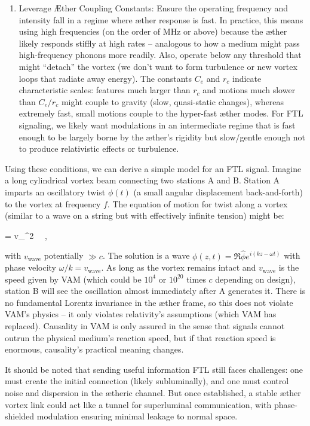 \begin{enumerate}
\item 
Leverage Æther Coupling Constants: Ensure the operating frequency and intensity fall in a regime where æther response is fast. In practice, this means using high frequencies (on the order of MHz or above) because the æther likely responds stiffly at high rates – analogous to how a medium might pass high-frequency phonons more readily. Also, operate below any threshold that might “detach” the vortex (we don’t want to form turbulence or new vortex loops that radiate away energy). The constants $C_e$ and $r_c$ indicate characteristic scales: features much larger than $r_c$ and motions much slower than $C_e/r_c$ might couple to gravity (slow, quasi-static changes), whereas extremely fast, small motions couple to the hyper-fast æther modes. For FTL signaling, we likely want modulations in an intermediate regime that is fast enough to be largely borne by the æther’s rigidity but slow/gentle enough not to produce relativistic effects or turbulence.




\end{enumerate}

Using these conditions, we can derive a simple model for an FTL signal. Imagine a long cylindrical vortex beam connecting two stations A and B. Station A imparts an oscillatory twist $\phi(t)$ (a small angular displacement back-and-forth) to the vortex at frequency $f$. The equation of motion for twist along a vortex (similar to a wave on a string but with effectively infinite tension) might be:


  = v_^2 \, ~, 


with $v_\text{wave}$ potentially $\gg c$. The solution is a wave $\phi(z,t) = \Re{\hat{\phi} e^{i(kz - \omega t)}}$ with phase velocity $\omega/k = v_\text{wave}$. As long as the vortex remains intact and $v_\text{wave}$ is the speed given by VAM (which could be $10^4$ or $10^{20}$ times $c$ depending on design), station B will see the oscillation almost immediately after A generates it. There is no fundamental Lorentz invariance in the æther frame, so this does not violate VAM’s physics – it only violates relativity’s assumptions (which VAM has replaced). Causality in VAM is only assured in the sense that signals cannot outrun the physical medium’s reaction speed, but if that reaction speed is enormous, causality’s practical meaning changes.


It should be noted that sending useful information FTL still faces challenges: one must create the initial connection (likely subluminally), and one must control noise and dispersion in the ætheric channel. But once established, a stable æther vortex link could act like a tunnel for superluminal communication, with phase-shielded modulation ensuring minimal leakage to normal space.


